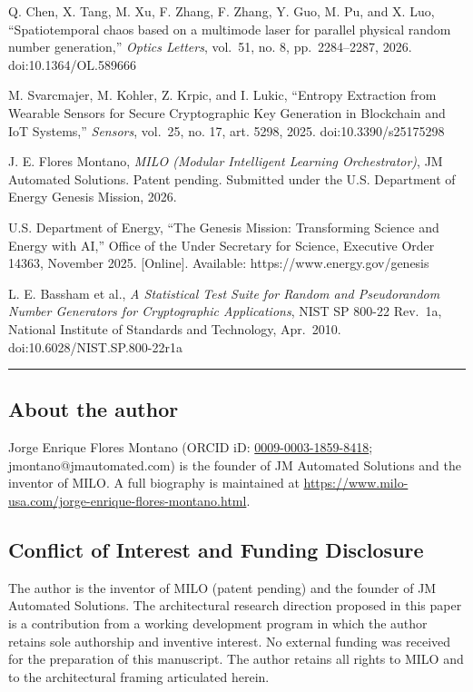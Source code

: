 \cite{ref6} Q. Chen, X. Tang, M. Xu, F. Zhang, F. Zhang, Y. Guo, M. Pu, and
X. Luo, ``Spatiotemporal chaos based on a multimode laser for parallel
physical random number generation,'' \emph{Optics Letters}, vol.~51, no.
8, pp.~2284--2287, 2026. doi:10.1364/OL.589666

\cite{ref7} M. Svarcmajer, M. Kohler, Z. Krpic, and I. Lukic, ``Entropy
Extraction from Wearable Sensors for Secure Cryptographic Key Generation
in Blockchain and IoT Systems,'' \emph{Sensors}, vol.~25, no. 17, art.
5298, 2025. doi:10.3390/s25175298

\cite{ref8} J. E. Flores Montano, \emph{MILO (Modular Intelligent Learning
Orchestrator)}, JM Automated Solutions. Patent pending. Submitted under
the U.S. Department of Energy Genesis Mission, 2026.

\cite{ref9} U.S. Department of Energy, ``The Genesis Mission: Transforming
Science and Energy with AI,'' Office of the Under Secretary for Science,
Executive Order 14363, November 2025. {[}Online{]}. Available:
https://www.energy.gov/genesis

\cite{ref10} L. E. Bassham et al., \emph{A Statistical Test Suite for Random
and Pseudorandom Number Generators for Cryptographic Applications}, NIST
SP 800-22 Rev.~1a, National Institute of Standards and Technology,
Apr.~2010. doi:10.6028/NIST.SP.800-22r1a

\begin{center}\rule{0.5\linewidth}{0.5pt}\end{center}

\subsection{About the author}\label{about-the-author}

Jorge Enrique Flores Montano (ORCID iD:
\href{https://orcid.org/0009-0003-1859-8418}{0009-0003-1859-8418};
jmontano@jmautomated.com) is the founder of JM Automated Solutions and
the inventor of MILO. A full biography is maintained at
\url{https://www.milo-usa.com/jorge-enrique-flores-montano.html}.

\subsection{Conflict of Interest and Funding
Disclosure}\label{conflict-of-interest-and-funding-disclosure}

The author is the inventor of MILO (patent pending) and the founder of
JM Automated Solutions. The architectural research direction proposed in
this paper is a contribution from a working development program in which
the author retains sole authorship and inventive interest. No external
funding was received for the preparation of this manuscript. The author
retains all rights to MILO and to the architectural framing articulated
herein.

